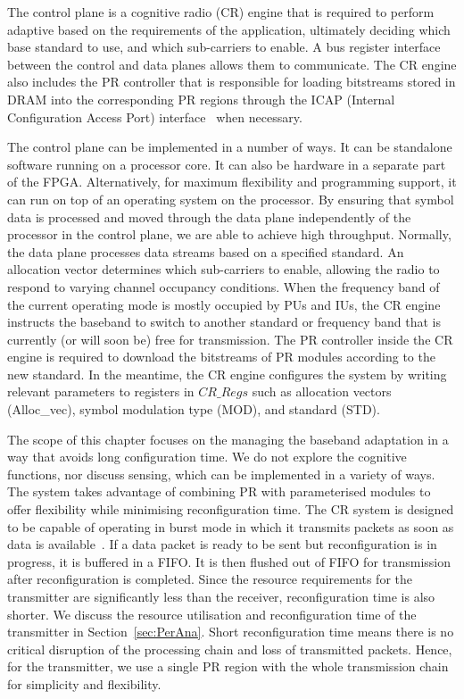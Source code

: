 The control plane is a cognitive radio (CR) engine that is required to perform adaptive based on the requirements of the application, ultimately deciding which base standard to use, and which sub-carriers to enable.
A bus register interface between the control and data planes allows them to communicate.
The CR engine also includes the PR controller that is responsible for loading bitstreams stored in DRAM into the corresponding PR regions through the ICAP (Internal Configuration Access Port) interface~\cite{Vipin2012} when necessary.

The control plane can be implemented in a number of ways.
It can be standalone software running on a processor core. It can also be hardware in a separate part of the FPGA.
Alternatively, for maximum flexibility and programming support, it can run on top of an operating system on the processor.
By ensuring that symbol data is processed and moved through the data plane independently of the processor in the control plane, we are able to achieve high throughput.
Normally, the data plane processes data streams based on a specified standard.
An allocation vector determines which sub-carriers to enable, allowing the radio to respond to varying channel occupancy conditions.
When the frequency band of the current operating mode is mostly occupied by PUs and IUs, the CR engine instructs the baseband to switch to another standard or frequency band that is currently (or will soon be) free for transmission.
The PR controller inside the CR engine is required to download the bitstreams of PR modules according to the new standard.
In the meantime, the CR engine configures the system by writing relevant parameters to registers in $CR\_Regs$ such as allocation vectors (Alloc\_vec), symbol modulation type (MOD), and standard (STD).

The scope of this chapter focuses on the managing the baseband adaptation in a way that avoids long configuration time.
We do not explore the cognitive functions, nor discuss sensing, which can be implemented in a variety of ways.
The system takes advantage of combining PR with parameterised modules to offer flexibility while minimising reconfiguration time.
The CR system is designed to be capable of operating in burst mode in which it transmits packets as soon as data is available~\cite{Ai2006}.
If a data packet is ready to be sent but reconfiguration is in progress, it is buffered in a FIFO.
It is then flushed out of FIFO for transmission after reconfiguration is completed.
Since the resource requirements for the transmitter are significantly less than the receiver, reconfiguration time is also shorter.
We discuss the resource utilisation and reconfiguration time of the transmitter in Section~\ref{sec:PerAna}.
Short reconfiguration time means there is no critical disruption of the processing chain and loss of transmitted packets.
Hence, for the transmitter, we use a single PR region with the whole transmission chain for simplicity and flexibility.


